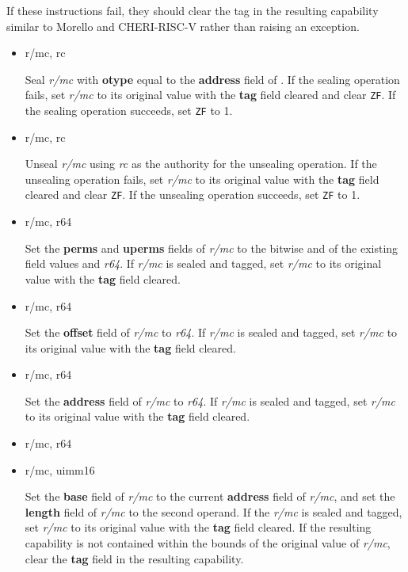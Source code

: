 If these instructions fail, they should clear the tag in the resulting
capability similar to Morello and CHERI-RISC-V rather than raising an
exception.

\begin{itemize}
  \item {} r/mc, rc

    Seal \emph{r/mc} with \textbf{otype} equal to the \textbf{address}
    field of .  If the sealing operation fails, set
    \emph{r/mc} to its original value with the \textbf{tag} field
    cleared and clear \texttt{ZF}.  If the sealing operation succeeds,
    set \texttt{ZF} to 1.

  \item {} r/mc, rc

    Unseal \emph{r/mc} using \emph{rc} as the authority for the
    unsealing operation.  If the unsealing operation fails, set
    \emph{r/mc} to its original value with the \textbf{tag} field
    cleared and clear \texttt{ZF}.  If the unsealing operation
    succeeds, set \texttt{ZF} to 1.

  \item {} r/mc, r64

    Set the \textbf{perms} and \textbf{uperms} fields of \emph{r/mc}
    to the bitwise and of the existing field values and \emph{r64}.
    If \emph{r/mc} is sealed and tagged, set \emph{r/mc} to its
    original value with the \textbf{tag} field cleared.

  \item {} r/mc, r64

    Set the \textbf{offset} field of \emph{r/mc} to \emph{r64}.  If
    \emph{r/mc} is sealed and tagged, set \emph{r/mc} to its original
    value with the \textbf{tag} field cleared.

  \item {} r/mc, r64

    Set the \textbf{address} field of \emph{r/mc} to \emph{r64}.  If
    \emph{r/mc} is sealed and tagged, set \emph{r/mc} to its original
    value with the \textbf{tag} field cleared.

  \item {} r/mc, r64
  \item {} r/mc, uimm16

    Set the \textbf{base} field of \emph{r/mc} to the current
    \textbf{address} field of \emph{r/mc}, and set the \textbf{length}
    field of \emph{r/mc} to the second operand.  If the \emph{r/mc} is
    sealed and tagged, set \emph{r/mc} to its original value with the
    \textbf{tag} field cleared.  If the resulting capability is not
    contained within the bounds of the original value of \emph{r/mc},
    clear the \textbf{tag} field in the resulting capability.


\end{itemize}
